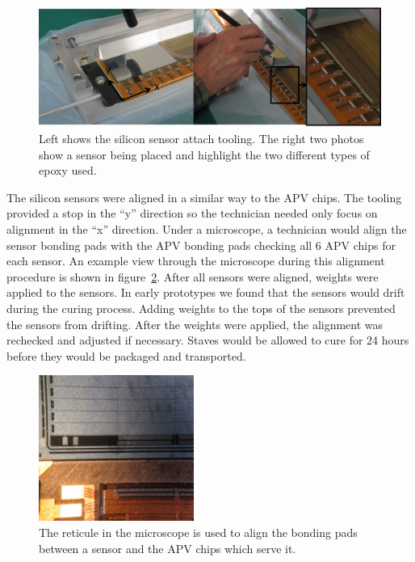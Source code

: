 \documentclass[1p,12pt]{elsarticle}
\begin{document}
\begin{figure}[h]
\begin{center}
\includegraphics[width=6in, keepaspectratio=true, angle=0]{graphics/si_glue.jpg}
\caption{Left shows the silicon sensor attach tooling.  The right two photos show
a sensor being placed and highlight the two different types of epoxy used.
\label{fig:si_glue}}
\end{center}
\end{figure}
%
The silicon sensors were aligned in a similar way to the APV chips. The tooling
provided a stop in the ``y'' direction so the technician needed only focus on
alignment in the ``x'' direction. Under a microscope, a technician would align the
sensor bonding pads with the APV bonding pads checking all 6 APV chips for each
sensor. An example view through the microscope during this alignment procedure
is shown in figure~\ref{fig:si_align}. After all sensors were aligned, weights were applied to the sensors.
In early prototypes we found that the sensors would drift during the curing
process. Adding weights to the tops of the sensors prevented the sensors from
drifting. After the weights were applied, the alignment was rechecked and
adjusted if necessary. Staves would be allowed to cure for 24 hours before
they would be packaged and transported.

\begin{figure}[h]
\begin{center}
\includegraphics[width=2in, keepaspectratio=true, angle=0]{graphics/si_align.JPG}
\caption{The reticule in the microscope is used to align the bonding pads
between a sensor and the APV chips which serve it.
\label{fig:si_align}}
\end{center}
\end{figure}
%
\end{document}
